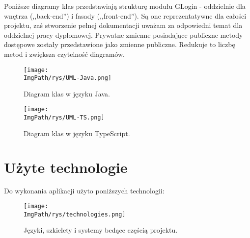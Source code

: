 \documentclass[a4paper,12pt,twoside,openany]{report}
\newcommand{\ImgPath}{.}
\begin{document}
	Poniższe diagramy klas przedstawiają strukturę modułu GLogin - oddzielnie dla wnętrza (,,back-end'') i fasady (,,front-end''). Są one reprezentatywne dla całości projektu, zaś stworzenie pełnej dokumentacji uważam za odpowiedni temat dla oddzielnej pracy dyplomowej. Prywatne zmienne posiadające publiczne metody dostępowe zostały przedstawione jako zmienne publiczne. Redukuje to liczbę metod i zwiększa czytelność diagramów.
	\begin{figure}[!htbp]
		\begin{center}
			\centering
			\texttt{[image: \\ImgPath/rys/UML-Java.png]}
		\end{center}
		\caption{Diagram klas w języku Java.}
		\label{UMLJava}
	\end{figure}
		\begin{figure}[!htbp]
			\begin{center}
				\centering
				\texttt{[image: \\ImgPath/rys/UML-TS.png]}
			\end{center}
			\caption{Diagram klas w języku TypeScript.}
			\label{UMLTS}
		\end{figure}
\section{Użyte technologie}
Do wykonania aplikacji użyto poniższych technologii: 
	\begin{figure}[!htbp]
		\begin{center}
			\centering
			\texttt{[image: \\ImgPath/rys/technologies.png]}
		\end{center}
		\caption{Języki, szkielety i systemy bedące częścią projektu.}
		\label{technologies}
	\end{figure}	
\end{document}
